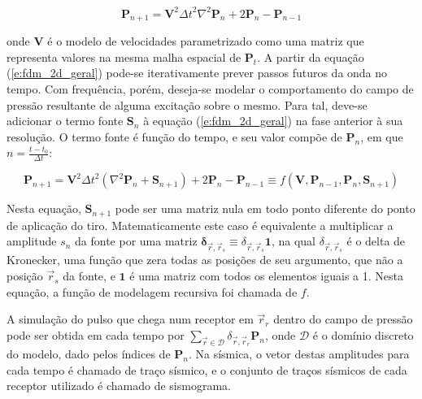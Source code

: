     \begin{equation} \label{e:fdm_2d_geral}
      \boldsymbol{P}_{n+1} =
        \boldsymbol{V}^2 {\Delta t}^2
        \nabla^2 \boldsymbol{P}_{n} +
        2 \boldsymbol{P}_{n} -
        \boldsymbol{P}_{n-1}
    \end{equation}

    \noindent onde $\boldsymbol{V}$ é o modelo de velocidades parametrizado como uma matriz que representa valores na mesma malha espacial de $\boldsymbol{P}_t$. A partir da equação (\ref{e:fdm_2d_geral}) pode-se iterativamente prever passos futuros da onda no tempo. Com frequência, porém, deseja-se modelar o comportamento do campo de pressão resultante de alguma excitação sobre o mesmo. Para tal, deve-se adicionar o termo fonte $\boldsymbol{S}_n$ à equação (\ref{e:fdm_2d_geral}) na fase anterior à sua resolução. O termo fonte é função do tempo, e seu valor compõe de $\boldsymbol{P}_{n}$, em que $n=\frac{t-t_0}{\Delta t}$:

    \begin{equation} \label{e:fdm_2d_geral_com_fonte}
      \boldsymbol{P}_{n+1} =
        \boldsymbol{V}^2 {\Delta t}^2
        (\nabla^2 \boldsymbol{P}_{n} + \boldsymbol{S}_{n+1}) +
        2 \boldsymbol{P}_{n} -
        \boldsymbol{P}_{n-1}
        \equiv f(\boldsymbol{V}, \boldsymbol{P}_{n-1}, \boldsymbol{P}_n, \boldsymbol{S}_{n+1})
    \end{equation}

    Nesta equação, $\boldsymbol{S}_{n+1}$ pode ser uma matriz nula em todo ponto diferente do ponto de aplicação do tiro. Matematicamente este caso é equivalente a multiplicar a amplitude $s_n$ da fonte por uma matriz $\boldsymbol{\delta}_{\vec{r}, \vec{r}_s} \equiv \delta_{\vec{r}, \vec{r}_s} \boldsymbol{1}$, na qual $\delta_{\vec{r}, \vec{r}_s}$ é o delta de Kronecker, uma função que zera todas as posições de seu argumento, que não a posição $\vec{r}_s$ da fonte, e $\boldsymbol{1}$ é uma matriz com todos os elementos iguais a 1. Nesta equação, a função de modelagem recursiva foi chamada de $f$.

    A simulação do pulso que chega num receptor em $\vec{r}_r$ dentro do campo de pressão pode ser obtida em cada tempo por $\sum_{\vec{r} \in \mathcal{D}} \delta_{\vec{r}, \vec{r}_r} {\boldsymbol{P}_n}$, onde $\mathcal{D}$ é o domínio discreto do modelo, dado pelos índices de $\boldsymbol{P}_n$. Na sísmica, o vetor destas amplitudes para cada tempo é chamado de traço sísmico, e o conjunto de traços sísmicos de cada receptor utilizado é chamado de sismograma.

